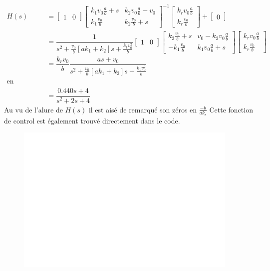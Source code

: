 \documentclass[11pt,a4paper]{article}
\begin{document}
\begin{align*}
	H(s) & = \begin{bmatrix} 1 & 0  \end{bmatrix} \begin{bmatrix}  k_1 v_0  \frac ab +s & k_2v_0  \frac ab - v_0 \\ k_1 \frac {v_0} b & k_2 \frac{v_0}b+s \end{bmatrix}^{-1}
	\begin{bmatrix} k_r v_0 \frac ab \\  k_r \frac{v_0}b \end{bmatrix} + \begin{bmatrix}  0  \end{bmatrix}                                                                                                                         \\
	     & =\dfrac{1}{s^2 + \frac{v_0}b [a k_1 + k_2]s + \frac{k_1 v_0 ^2}b} \begin{bmatrix} 1 & 0 \end{bmatrix} \begin{bmatrix}k_2 \frac{v_0}b+s & v_0 -k_2 v_0 \frac ab \\ - k_1 \frac{v_0}b & k_1 v_0 \frac ab +s \end{bmatrix}
	\begin{bmatrix} k_r v_0 \frac ab \\ k_r \frac {v_0}b \end{bmatrix}                                                                                                                                                             \\
	     & =\dfrac{k_r v_0}{b}\dfrac{as+v_0}{s^2 + \frac{v_0}b [a k_1 + k_2 ]s + \frac{k_1 v_0 ^2}b}                                                                                                                                \\
	\text{en remplacant par les valeurs on obtient;}                                                                                                                                                                               \\
	     & = \dfrac{0.440s + 4}{s^2 + 2 s + 4}
\end{align*}
Au vu de l'alure de $H(s)$ il est aisé de remarqué son zéros en $\frac{-b}{a k_r}$
Cette fonction de control est également trouvé directement dans le code.

\begin{figure}[!h]
  \begin{center}
    \includegraphics[width=0.95\textwidth]{jlplots/Q3.pdf}
  \end{center}
  \caption{}\label{fig:bode}
\end{figure}
\end{document}
